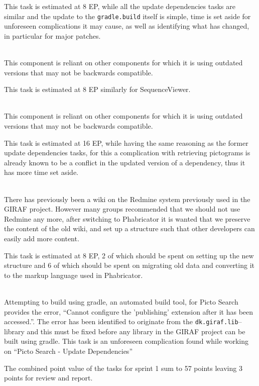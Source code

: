 \begin{description}[style=unboxed]
        This task is estimated at 8 EP, while all the update dependencies tasks are similar and the update to the \texttt{gradle.build} itself is simple, time is set aside for unforeseen complications it may cause, as well as identifying what has changed, in particular for major patches.
    \item[{[}HIGH{]} Sequence - Update dependencies] \hfill \\ 
        This component is reliant on other components for which it is using outdated versions that may not be backwards compatible.

        This task is estimated at 8 EP similarly for SequenceViewer.
    \item[{[}HIGH{]} Picto Search - Update dependencies] \hfill \\
        This component is reliant on other components for which it is using outdated versions that may not be backwards compatible.
    
        This task is estimated at 16 EP, while having the same reasoning as the former update dependencies tasks, for this a complication with retrieving pictograms is already known to be a conflict in the updated version of a dependency, thus it has more time set aside.
    \item[{[}HIGH{]} Wiki - Setup new structure and migrate to Phabricator] \hfill \\
        There has previously been a wiki on the Redmine system previously used in the GIRAF project. 
        However many groups recommended that we should not use Redmine any more, after switching to Phabricator it is wanted that we preserve the content of the old wiki, and set up a structure such that other developers can easily add more content.

        This task is estimated at 8 EP, 2 of which should be spent on setting up the new structure and 6 of which should be spent on migrating old data and converting it to the markup language used in Phabricator. 
    \item[{[}UNBREAK NOW!{]} Gradle - Custom plug-in dk.giraf.lib for gradle breaks build] \hfill \\
        Attempting to build using gradle, an automated build tool, for Picto Search provides the error, ``Cannot configure the 'publishing' extension after it has been accessed.''. 
        The error has been identified to originate from the \texttt{dk.giraf.lib}--library and this must be fixed before any library in the GIRAF project can be built using gradle. 
        This task is an unforeseen complication found while working on ``Picto Search - Update Dependencies''
\end{description}
The combined point value of the tasks for sprint 1 sum to 57 points leaving 3 points for review and report.
